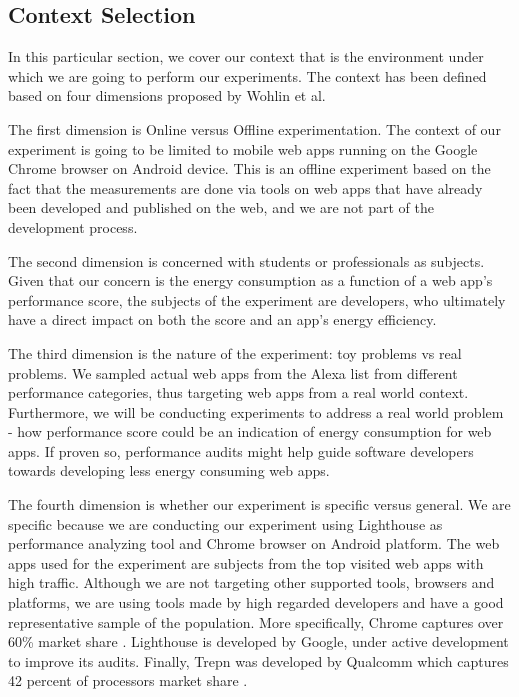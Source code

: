\subsection{Context Selection}

In this particular section, we cover our context that is the environment under which we are going to perform our experiments. The context has been defined based on four dimensions proposed by Wohlin et al. \cite{Book:Exp}

The first dimension is Online versus Offline experimentation. The context of our experiment is going to be limited to mobile web apps running on the Google Chrome browser on Android device. This is an offline experiment based on the fact that the measurements are done via tools on web apps that have already been developed and published on the web, and we are not part of the development process.

The second dimension is concerned with students or professionals as subjects. Given that our concern is the energy consumption as a function of a web app's performance score, the subjects of the experiment are developers, who ultimately have a direct impact on both the score and an app's energy efficiency.

The third dimension is the nature of the experiment: toy problems vs real problems. We sampled actual web apps from the Alexa list from different performance categories, thus targeting web apps from a real world context. Furthermore, we will be conducting experiments to address a real world problem - how performance score could be an indication of energy consumption for web apps. If proven so, performance audits might help guide software developers towards developing less energy consuming web apps.

 The fourth dimension is whether our experiment is specific versus general. We are specific because we are conducting our experiment using Lighthouse as performance analyzing tool and Chrome browser on Android platform. The web apps used for the experiment are subjects from the top visited web apps with high traffic. Although we are not targeting other supported tools, browsers and platforms, we are using tools made by high regarded developers and have a good representative sample of the population. More specifically, Chrome captures over 60\% market share \cite{WEBSITE:16}. Lighthouse is developed by Google, under active development to improve its audits. Finally, Trepn was developed by Qualcomm which captures 42 percent of processors market share \cite{WEBSITE:17}. \newline


